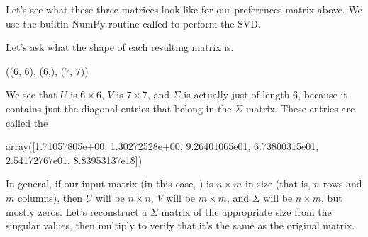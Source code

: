 \documentclass[letterpaper,10pt,english]{jupyterBook}
\begin{document}
\sphinxAtStartPar
Let’s see what these three matrices look like for our preferences matrix above.  We use the built\sphinxhyphen{}in NumPy routine called  to perform the SVD.

\begin{sphinxVerbatim}[commandchars=\\\{\}]
      
\end{sphinxVerbatim}

\sphinxAtStartPar
Let’s ask what the shape of each resulting matrix is.

\begin{sphinxVerbatim}[commandchars=\\\{\}]
  
\end{sphinxVerbatim}

\begin{sphinxVerbatim}[commandchars=\\\{\}]
((6, 6), (6,), (7, 7))
\end{sphinxVerbatim}

\sphinxAtStartPar
We see that \(U\) is \(6\times6\), \(V\) is \(7\times 7\), and \(\Sigma\) is actually just of length 6, because it contains just the diagonal entries that belong in the \(\Sigma\) matrix.  These entries are called the 

\begin{sphinxVerbatim}[commandchars=\\\{\}]
\end{sphinxVerbatim}

\begin{sphinxVerbatim}[commandchars=\\\{\}]
array([1.71057805e+00, 1.30272528e+00, 9.26401065e\PYGZhy{}01, 6.73800315e\PYGZhy{}01,
       2.54172767e\PYGZhy{}01, 8.83953137e\PYGZhy{}18])
\end{sphinxVerbatim}

\sphinxAtStartPar
In general, if our input matrix (in this case, ) is \(n\times m\) in size (that is, \(n\) rows and \(m\) columns), then \(U\) will be \(n\times n\), \(V\) will be \(m\times m\), and \(\Sigma\) will be \(n\times m\), but mostly zeros.  Let’s reconstruct a \(\Sigma\) matrix of the appropriate size from the singular values, then multiply  to verify that it’s the same as the original  matrix.
\end{document}
